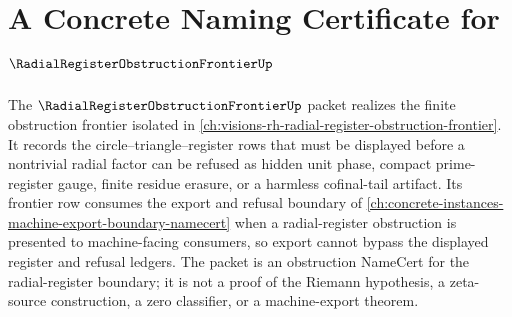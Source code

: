 \chapter{A Concrete Naming Certificate for $\RadialRegisterObstructionFrontierUp$}
\label{ch:concrete-instances-radial-register-obstruction-frontier-namecert}

The $\RadialRegisterObstructionFrontierUp$ packet realizes the finite obstruction frontier isolated in \autoref{ch:visions-rh-radial-register-obstruction-frontier}. It records the circle--triangle--register rows that must be displayed before a nontrivial radial factor can be refused as hidden unit phase, compact prime-register gauge, finite residue erasure, or a harmless cofinal-tail artifact. Its frontier row consumes the export and refusal boundary of \autoref{ch:concrete-instances-machine-export-boundary-namecert} when a radial-register obstruction is presented to machine-facing consumers, so export cannot bypass the displayed register and refusal ledgers. The packet is an obstruction NameCert for the radial-register boundary; it is not a proof of the Riemann hypothesis, a zeta-source construction, a zero classifier, or a machine-export theorem.

